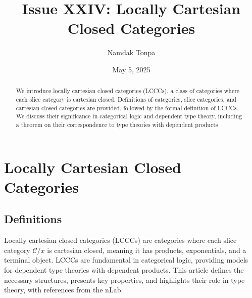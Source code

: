 \documentclass{article}
\begin{document}
\title{Issue XXIV: Locally Cartesian Closed Categories}
\author{Namdak Tonpa}
\date{May 5, 2025}

\maketitle

\begin{abstract}
We introduce locally cartesian closed categories (LCCCs), a class of categories where each slice category is cartesian closed. Definitions of categories, slice categories, and cartesian closed categories are provided, followed by the formal definition of LCCCs. We discuss their significance in categorical logic and dependent type theory, including a theorem on their correspondence to type theories with dependent products
\end{abstract}

\ifincludeTOC
  \tableofcontents
\fi

\section{Locally Cartesian Closed Categories}

\subsection{Definitions}

Locally cartesian closed categories (LCCCs) are categories where each slice category $\mathcal{C}/x$ is cartesian closed, meaning it has products, exponentials, and a terminal object. LCCCs are fundamental in categorical logic, providing models for dependent type theories with dependent products. This article defines the necessary structures, presents key properties, and highlights their role in type theory, with references from the nLab.
\end{document}
